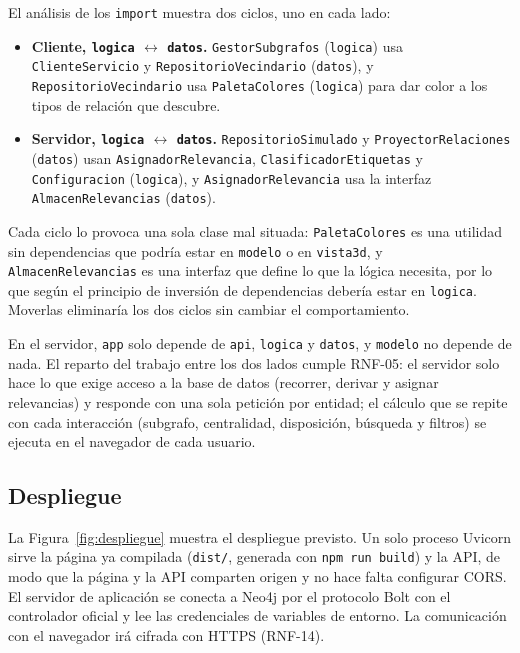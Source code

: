 El análisis de los \texttt{import} muestra dos ciclos, uno en cada lado:
\begin{itemize}
  \item \textbf{Cliente, \texttt{logica} $\leftrightarrow$ \texttt{datos}.} \texttt{GestorSubgrafos} (\texttt{logica}) usa \texttt{ClienteServicio} y \texttt{RepositorioVecindario} (\texttt{datos}), y \texttt{RepositorioVecindario} usa \texttt{PaletaColores} (\texttt{logica}) para dar color a los tipos de relación que descubre.
  \item \textbf{Servidor, \texttt{logica} $\leftrightarrow$ \texttt{datos}.} \texttt{RepositorioSimulado} y \texttt{ProyectorRelaciones} (\texttt{datos}) usan \texttt{AsignadorRelevancia}, \texttt{ClasificadorEtiquetas} y \texttt{Configuracion} (\texttt{logica}), y \texttt{AsignadorRelevancia} usa la interfaz \texttt{AlmacenRelevancias} (\texttt{datos}).
\end{itemize}
Cada ciclo lo provoca una sola clase mal situada: \texttt{PaletaColores} es una utilidad sin dependencias que podría estar en \texttt{modelo} o en \texttt{vista3d}, y \texttt{AlmacenRelevancias} es una interfaz que define lo que la lógica necesita, por lo que según el principio de inversión de dependencias debería estar en \texttt{logica}. Moverlas eliminaría los dos ciclos sin cambiar el comportamiento. 

En el servidor, \texttt{app} solo depende de \texttt{api}, \texttt{logica} y \texttt{datos}, y \texttt{modelo} no depende de nada. El reparto del trabajo entre los dos lados cumple RNF-05: el servidor solo hace lo que exige acceso a la base de datos (recorrer, derivar y asignar relevancias) y responde con una sola petición por entidad; el cálculo que se repite con cada interacción (subgrafo, centralidad, disposición, búsqueda y filtros) se ejecuta en el navegador de cada usuario.

\subsection{Despliegue}

La Figura~\ref{fig:despliegue} muestra el despliegue previsto. Un solo proceso Uvicorn sirve la página ya compilada (\texttt{dist/}, generada con \texttt{npm run build}) y la API, de modo que la página y la API comparten origen y no hace falta configurar CORS. El servidor de aplicación se conecta a Neo4j por el protocolo Bolt con el controlador oficial y lee las credenciales de variables de entorno. La comunicación con el navegador irá cifrada con HTTPS (RNF-14).

